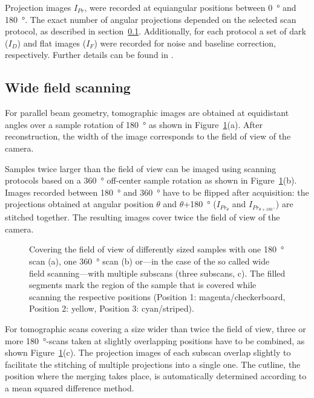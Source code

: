 Projection images $I_{Pr}$, were recorded at equiangular positions between \SI{0}{\degree} and \SI{180}{\degree}. The exact number of angular projections depended on the selected scan protocol, as described in section~\ref{subsec:wide field scanning}. Additionally, for each protocol a set of dark ($I_{D}$) and flat images ($I_{F}$) were recorded for noise and baseline correction, respectively. Further details can be found in 
\ifhtml
	\citet{Hintermueller2009}
\else
\fi%
.

\subsection{Wide field scanning}\label{subsec:wide field scanning}
For parallel beam geometry, tomographic images are obtained at equidistant angles over a sample rotation of \SI{180}{\degree} as shown in Figure~\ref{fig:scanning-possibilities}(a). After reconstruction, the width of the image corresponds to the field of view of the camera.

Samples twice larger than the field of view can be imaged using scanning protocols based on a \SI{360}{\degree} off-center sample rotation as shown in Figure~\ref{fig:scanning-possibilities}(b). Images recorded between \SI{180}{\degree} and \SI{360}{\degree} have to be flipped after acquisition: the projections obtained at angular position $\theta$ and $\theta$+\SI{180}{\degree} ($I_{Pr_{\theta}}$ and $I_{Pr_{\theta+\SI{180}{\degree}}}$) are stitched together. The resulting images cover twice the field of view of the camera.

\begin{figure}
	\centering
	\caption{Covering the field of view of differently sized samples with one \SI{180}{\degree} scan (a), one \SI{360}{\degree} scan (b) or---in the case of the so called wide field scanning---with multiple subscans (three subscans, c). The filled segments mark the region of the sample that is covered while scanning the respective positions (Position 1: magenta/checkerboard, Position 2: yellow, Position 3: cyan/striped).}%
	\ifiucr		
	\else
	\fi
	\label{fig:scanning-possibilities}%
\end{figure}

For tomographic scans covering a size wider than twice the field of view, three or more \SI{180}{\degree}-scans taken at slightly overlapping positions have to be combined, as shown Figure~\ref{fig:scanning-possibilities}(c). The projection images of each subscan overlap slightly to facilitate the stitching of multiple projections into a single one. The cutline, \ie the position where the merging takes place, is automatically determined according to a mean squared difference method.

